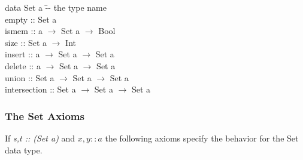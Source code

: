 \documentclass[11pt]{article}
\begin{document}
\begin{program**}
\>                           data Set a           \=-- the type name  \\
\>                           empty                \>:: Set a\\
\>                           ismem                \>:: a $\rightarrow$ Set a $\rightarrow$ Bool\\
\>                           size                 \>:: Set a $\rightarrow$ Int\\
\>                           insert               \>:: a $\rightarrow$ Set a $\rightarrow$ Set a\\
\>                           delete               \>:: a $\rightarrow$ Set a $\rightarrow$ Set a\\
\>                           union                \>:: Set a $\rightarrow$ Set a $\rightarrow$ Set a\\
\>                           intersection         \>:: Set a $\rightarrow$ Set a $\rightarrow$ Set a\\
\end{program**}

\subsubsection{The Set Axioms}

If {\it{s,t :: (Set a)}} and $x,y :: a$ the following axioms specify the behavior for the Set data type.
\end{document}
